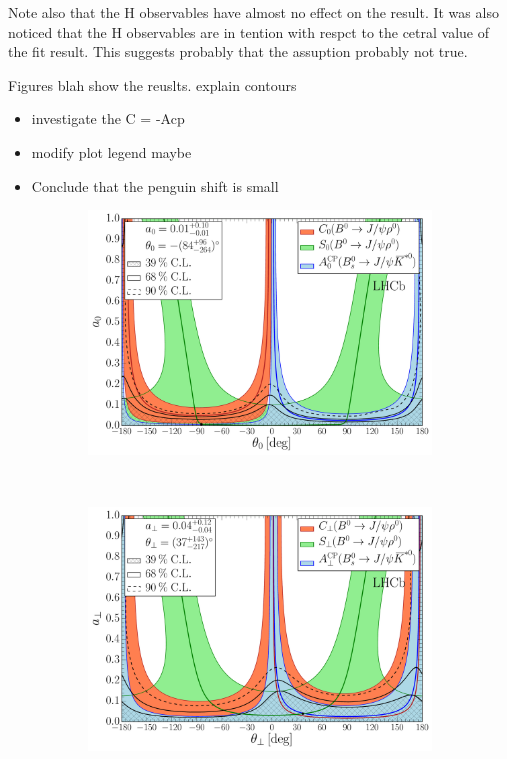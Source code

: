 Note also that the H observables have almost no effect on the result.
It was also noticed that the H observables are in tention with respct to the cetral value of the fit result.
This suggests probably that the assuption \equref{} probably not true.

Figures blah show the reuslts. {\color{red} explain contours}
\begin{itemize}
  \item investigate the C = -Acp
  \item modify plot legend maybe
  \item Conclude that the penguin shift is small
\end{itemize}

\begin{figure}[h]
\begin{center}
  \begin{subfigure}{1\textwidth}
    \includegraphics[trim=0.0cm 0.0cm 0.0cm 0.0cm, clip=true,scale=0.4]{Figures/Chapter5/Penguin_Contribution_Ang_vs_Abs_allB2VV_Long.pdf}
    \caption{}
    \label{pengPlot_long}
  \end{subfigure}\\
  \begin{subfigure}{1\textwidth}
    \includegraphics[trim=0.0cm 0.0cm 0.0cm 0.0cm, clip=true,scale=0.4]{Figures/Chapter5/Penguin_Contribution_Ang_vs_Abs_allB2VV_Perp.pdf}

\end{subfigure}
\end{center}
\end{figure}
